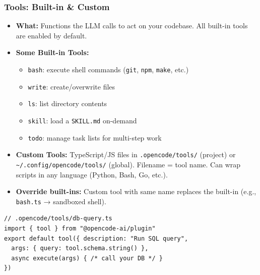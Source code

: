 \begin{frame}[fragile]\frametitle{Tools:  Built-in \& Custom}
  \begin{itemize}
    \item \textbf{What:} Functions the LLM calls to act on your codebase. All built-in tools are enabled by default.
    \item \textbf{Some Built-in Tools:}
      \begin{itemize}
        \item \texttt{bash}:  execute shell commands (\texttt{git}, \texttt{npm}, \texttt{make}, etc.)
        \item \texttt{write}:  create/overwrite files
        \item \texttt{ls}:  list directory contents
        \item \texttt{skill}:  load a \texttt{SKILL.md} on-demand
        \item \texttt{todo}:  manage task lists for multi-step work
      \end{itemize}
    \item \textbf{Custom Tools:} TypeScript/JS files in \texttt{.opencode/tools/} (project) or \texttt{\textasciitilde/.config/opencode/tools/} (global). Filename = tool name. Can wrap scripts in any language (Python, Bash, Go, etc.).
    \item \textbf{Override built-ins:} Custom tool with same name replaces the built-in (e.g., \texttt{bash.ts} → sandboxed shell).
  \end{itemize}
  
\begin{lstlisting}
// .opencode/tools/db-query.ts
import { tool } from "@opencode-ai/plugin"
export default tool({ description: "Run SQL query",
  args: { query: tool.schema.string() },
  async execute(args) { /* call your DB */ }
})
\end{lstlisting}  
\end{frame}

